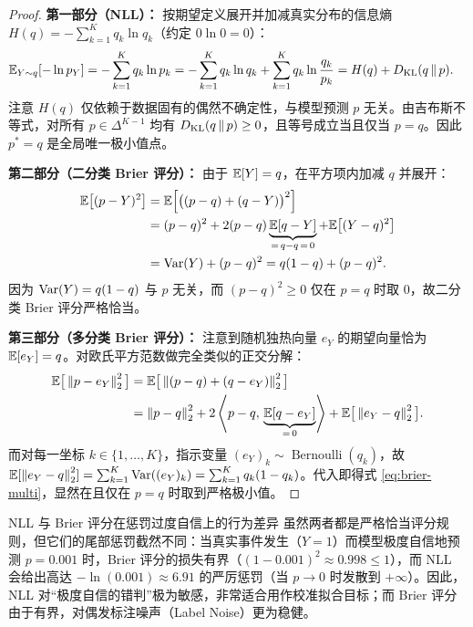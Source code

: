 \begin{proof}
\textbf{第一部分（NLL）：}
按期望定义展开并加减真实分布的信息熵 $H(q) = -\sum_{k=1}^K q_k \ln q_k$（约定 $0\ln 0 = 0$）：
\begin{align*}
  \mathbb{E}_{Y \sim q}[-\ln p_Y]
  &= -\sum_{k=1}^K q_k \ln p_k
   = -\sum_{k=1}^K q_k \ln q_k + \sum_{k=1}^K q_k \ln \frac{q_k}{p_k}
   = H(q) + D_{\mathrm{KL}}(q \,\|\, p).
\end{align*}
注意 $H(q)$ 仅依赖于数据固有的偶然不确定性，与模型预测 $p$ 无关。由吉布斯不等式，对所有 $p \in \Delta^{K-1}$ 均有 $D_{\mathrm{KL}}(q \,\|\, p) \ge 0$，且等号成立当且仅当 $p = q$。因此 $p^* = q$ 是全局唯一极小值点。

\textbf{第二部分（二分类 Brier 评分）：}
由于 $\mathbb{E}[Y] = q$，在平方项内加减 $q$ 并展开：
\begin{align*}
  \mathbb{E}\big[(p - Y)^2\big]
  &= \mathbb{E}\Big[\big((p - q) + (q - Y)\big)^2\Big] \\
  &= (p - q)^2 + 2(p - q)\underbrace{\mathbb{E}[q - Y]}_{=\,q - q \,=\, 0} + \mathbb{E}\big[(Y - q)^2\big] \\
  &= \operatorname{Var}(Y) + (p - q)^2 = q(1-q) + (p - q)^2.
\end{align*}
因为 $\operatorname{Var}(Y) = q(1-q)$ 与 $p$ 无关，而 $(p-q)^2 \ge 0$ 仅在 $p=q$ 时取 $0$，故二分类 Brier 评分严格恰当。

\textbf{第三部分（多分类 Brier 评分）：}
注意到随机独热向量 $e_Y$ 的期望向量恰为 $\mathbb{E}[e_Y] = q$。对欧氏平方范数做完全类似的正交分解：
\begin{align*}
  \mathbb{E}\big[\left\|p - e_Y\right\|_2^2\big]
  &= \mathbb{E}\big[\left\|(p - q) + (q - e_Y)\right\|_2^2\big] \\
  &= \left\|p - q\right\|_2^2 + 2\left\langle p - q,\, \underbrace{\mathbb{E}[q - e_Y]}_{=\,0} \right\rangle + \mathbb{E}\big[\left\|e_Y - q\right\|_2^2\big].
\end{align*}
而对每一坐标 $k \in \{1,\dots,K\}$，指示变量 $(e_Y)_k \sim \operatorname{Bernoulli}(q_k)$，故 $\mathbb{E}[\left\|e_Y - q\right\|_2^2] = \sum_{k=1}^K \operatorname{Var}((e_Y)_k) = \sum_{k=1}^K q_k(1-q_k)$。代入即得式 \eqref{eq:brier-multi}，显然在且仅在 $p = q$ 时取到严格极小值。
\end{proof}

\begin{insightBox}{NLL 与 Brier 评分在惩罚过度自信上的行为差异}
虽然两者都是严格恰当评分规则，但它们的尾部惩罚截然不同：当真实事件发生（$Y=1$）而模型极度自信地预测 $p = 0.001$ 时，Brier 评分的损失有界（$(1 - 0.001)^2 \approx 0.998 \le 1$），而 NLL 会给出高达 $-\ln(0.001) \approx 6.91$ 的严厉惩罚（当 $p \to 0$ 时发散到 $+\infty$）。因此，NLL 对“极度自信的错判”极为敏感，非常适合用作校准拟合目标；而 Brier 评分由于有界，对偶发标注噪声（Label Noise）更为稳健。
\end{insightBox}

